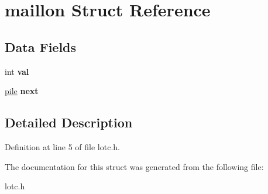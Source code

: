 \hypertarget{structmaillon}{}\section{maillon Struct Reference}
\label{structmaillon}
\subsection*{Data Fields}
\begin{DoxyCompactItemize}
\item 
int {\bfseries val}\hypertarget{structmaillon_aa0ccb5ee6d882ee3605ff47745c6467b}{}\label{structmaillon_aa0ccb5ee6d882ee3605ff47745c6467b}

\item 
\hyperlink{structmaillon}{pile} {\bfseries next}\hypertarget{structmaillon_a33a532c06ee8f5b75074338a9aaf362f}{}\label{structmaillon_a33a532c06ee8f5b75074338a9aaf362f}

\end{DoxyCompactItemize}


\subsection{Detailed Description}


Definition at line 5 of file lotc.\+h.



The documentation for this struct was generated from the following file\+:\begin{DoxyCompactItemize}
\item 
lotc.\+h\end{DoxyCompactItemize}
